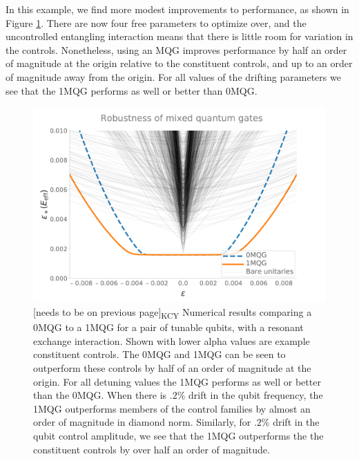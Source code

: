 \documentclass[aps,nofootinbib,pra,notitlepage,twocolumn]{revtex4-1}
\newcommand{\kcy}[1]{{\color{red}[#1]\textsubscript{\rm{KCY}}}}
\begin{document}
In this example, we find more modest improvements to performance, as shown in Figure \ref{fig:2MQG}. There are now four free parameters to optimize over, and the uncontrolled entangling interaction means that there is little room for variation in the controls. Nonetheless, using an MQG improves performance by half an order of magnitude at the origin relative to the constituent controls, and up to an order of magnitude away from the origin. For all values of the drifting parameters we see that the 1MQG performs as well or better than 0MQG.

\begin{figure}
  \centering
  \includegraphics[width=\columnwidth]{figures/2q_robustness.pdf}
  \caption{\kcy{needs to be on previous page} Numerical results comparing a 0MQG to a 1MQG for a pair of tunable qubits, with a resonant exchange interaction. Shown with lower alpha values are example constituent controls. The 0MQG and 1MQG can be seen to outperform these controls by half of an order of magnitude at the origin. For all detuning values the 1MQG performs as well or better than the 0MQG. When there is $.2\%$ drift in the qubit frequency, the 1MQG outperforms members of the control families by almost an order of magnitude in diamond norm. Similarly, for $.2\%$ drift in the qubit control amplitude, we see that the 1MQG outperforms the the constituent controls by over half an order of magnitude.}
  \label{fig:2MQG}
\end{figure}






\end{document}
